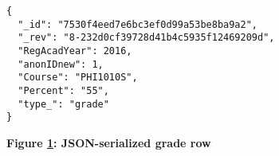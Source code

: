 \begin{figure}[H]
  \centering
  \begin{mdframed}
    \centering
    \begin{verbatim}
{
  "_id": "7530f4eed7e6bc3ef0d99a53be8ba9a2",
  "_rev": "8-232d0cf39728d41b4c5935f12469209d",
  "RegAcadYear": 2016,
  "anonIDnew": 1,
  "Course": "PHI1010S",
  "Percent": "55",
  "type_": "grade"
}    
        \end{verbatim}
  \end{mdframed}
  \caption[JSON-serialized grade row]{\textbf{Figure \ref{fig-json-grade}: JSON-serialized grade row}}
  \label{fig-json-grade}
\end{figure}